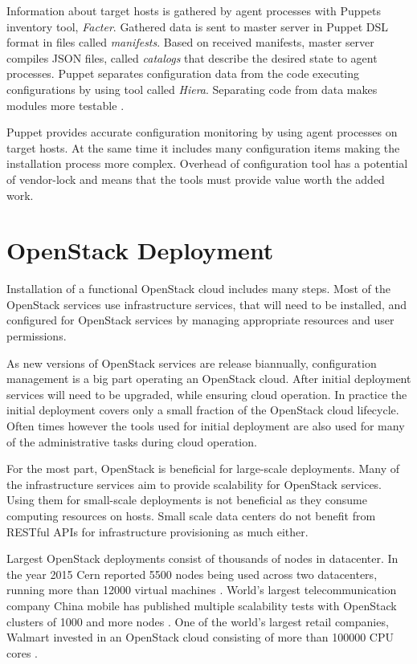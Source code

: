 Information about target hosts is gathered by agent processes with Puppets
inventory tool, \textit{Facter}. Gathered data is sent to master server in
Puppet DSL format in files called \textit{manifests}. Based on received
manifests, master server compiles JSON files, called \textit{catalogs} that
describe the desired state to agent processes. Puppet separates configuration
data from the code executing configurations by using tool called
\textit{Hiera}. Separating code from data makes modules more testable
\cite{puppet}.

Puppet provides accurate configuration monitoring by using agent processes on
target hosts. At the same time it includes many configuration items making the
installation process more complex. Overhead of configuration tool has a
potential of vendor-lock and means that the tools must provide value worth the
added work.

\chapter{OpenStack Deployment}\label{deployment}

Installation of a functional OpenStack cloud includes many steps. Most of the
OpenStack services use infrastructure services, that will need to be installed,
and configured for OpenStack services by managing appropriate resources and
user permissions.

As new versions of OpenStack services are release biannually, configuration
management is a big part operating an OpenStack cloud. After initial deployment
services will need to be upgraded, while ensuring cloud operation. In practice
the initial deployment covers only a small fraction of the OpenStack cloud
lifecycle. Often times however the tools used for initial deployment are also
used for many of the administrative tasks during cloud operation.

For the most part, OpenStack is beneficial for large-scale deployments. Many of
the infrastructure services aim to provide scalability for OpenStack services.
Using them for small-scale deployments is not beneficial as they consume
computing resources on hosts. Small scale data centers do not benefit from
RESTful APIs for infrastructure provisioning as much either.

Largest OpenStack deployments consist of thousands of nodes in datacenter. In
the year 2015 Cern reported 5500 nodes being used across two datacenters,
running more than 12000 virtual machines \cite{cern}. World's largest
telecommunication company China mobile has published multiple scalability tests
with OpenStack clusters of 1000 and more nodes \cite{china-mobile}. One of the
world's largest retail companies, Walmart invested in an OpenStack cloud
consisting of more than 100000 CPU cores \cite{walmart}.


